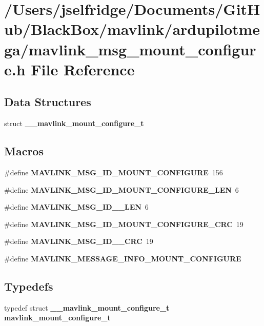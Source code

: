 \section{/\+Users/jselfridge/\+Documents/\+Git\+Hub/\+Black\+Box/mavlink/ardupilotmega/mavlink\+\_\+msg\+\_\+mount\+\_\+configure.h File Reference}
\label{mavlink__msg__mount__configure_8h}
\subsection*{Data Structures}
\begin{DoxyCompactItemize}
\item 
struct \textbf{ \+\_\+\+\_\+mavlink\+\_\+mount\+\_\+configure\+\_\+t}
\end{DoxyCompactItemize}
\subsection*{Macros}
\begin{DoxyCompactItemize}
\item 
\#define \textbf{ M\+A\+V\+L\+I\+N\+K\+\_\+\+M\+S\+G\+\_\+\+I\+D\+\_\+\+M\+O\+U\+N\+T\+\_\+\+C\+O\+N\+F\+I\+G\+U\+RE}~156
\item 
\#define \textbf{ M\+A\+V\+L\+I\+N\+K\+\_\+\+M\+S\+G\+\_\+\+I\+D\+\_\+\+M\+O\+U\+N\+T\+\_\+\+C\+O\+N\+F\+I\+G\+U\+R\+E\+\_\+\+L\+EN}~6
\item 
\#define \textbf{ M\+A\+V\+L\+I\+N\+K\+\_\+\+M\+S\+G\+\_\+\+I\+D\+\_\+\_\+\+L\+EN}~6
\item 
\#define \textbf{ M\+A\+V\+L\+I\+N\+K\+\_\+\+M\+S\+G\+\_\+\+I\+D\+\_\+\+M\+O\+U\+N\+T\+\_\+\+C\+O\+N\+F\+I\+G\+U\+R\+E\+\_\+\+C\+RC}~19
\item 
\#define \textbf{ M\+A\+V\+L\+I\+N\+K\+\_\+\+M\+S\+G\+\_\+\+I\+D\+\_\+\_\+\+C\+RC}~19
\item 
\#define \textbf{ M\+A\+V\+L\+I\+N\+K\+\_\+\+M\+E\+S\+S\+A\+G\+E\+\_\+\+I\+N\+F\+O\+\_\+\+M\+O\+U\+N\+T\+\_\+\+C\+O\+N\+F\+I\+G\+U\+RE}
\end{DoxyCompactItemize}
\subsection*{Typedefs}
\begin{DoxyCompactItemize}
\item 
typedef struct \textbf{ \+\_\+\+\_\+mavlink\+\_\+mount\+\_\+configure\+\_\+t} \textbf{ mavlink\+\_\+mount\+\_\+configure\+\_\+t}
\end{DoxyCompactItemize}


